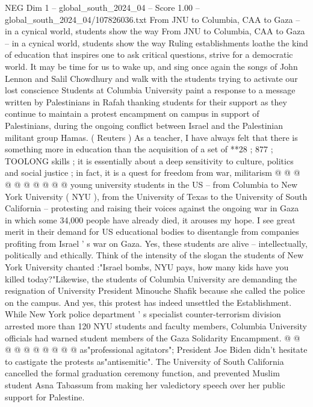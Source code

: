 \begin{textsample}{NEG Dim 1 – global\_south\_2024\_04 – Score 1.00 – global\_south\_2024\_04/107826036.txt}  \label{ex:f1_neg_410}
From JNU to Columbia, CAA to Gaza -- in a cynical world, students show the way From JNU to Columbia, CAA to Gaza -- in a cynical world, students show the way Ruling establishments loathe the kind of education that inspires one to ask critical questions, strive for a democratic world.
It may be time for us to wake up, and sing once again the songs of John Lennon and Salil Chowdhury and walk with the students trying to activate our lost conscience Students at Columbia University paint a response to a message written by Palestinians in Rafah thanking students for their support as they continue to maintain a protest encampment on campus in support of Palestinians, during the ongoing conflict between Israel and the Palestinian militant group Hamas. ( Reuters ) As a teacher, I have always felt that there is something more in education than the acquisition of a set of **28 ; 877 ; TOOLONG skills ; it is essentially about a deep sensitivity to culture, politics and social justice ; in fact, it is a quest for freedom from war, militarism @ @ @ @ @ @ @ @ @ @ young university students in the US -- from Columbia to New York University ( NYU ), from the University of Texas to the University of South California -- protesting and raising their voices against the ongoing war in Gaza in which some 34,000 people have already died, it arouses my hope.
I see great merit in their demand for US educational bodies to disentangle from companies profiting from Israel ' s war on Gaza.
Yes, these students are alive -- intellectually, politically and ethically.
Think of the intensity of the slogan the students of New York University chanted :"Israel bombs, NYU pays, how many kids have you killed today?"Likewise, the students of Columbia University are demanding the resignation of University President Minouche Shafik because she called the police on the campus.
And yes, this protest has indeed unsettled the Establishment.
While New York police department ' s specialist counter-terrorism division arrested more than 120 NYU students and faculty members, Columbia University officials had warned student members of the Gaza Solidarity Encampment. @ @ @ @ @ @ @ @ @ @ as"professional agitators"; President Joe Biden didn't hesitate to castigate the protests as"antisemitic".
The University of South California cancelled the formal graduation ceremony function, and prevented Muslim student Asna Tabassum from making her valedictory speech over her public support for Palestine.

\end{textsample}
